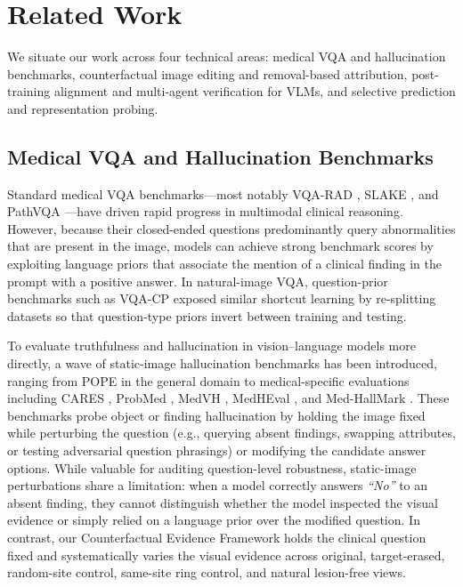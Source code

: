 \documentclass[5p,times,twocolumn,authoryear]{elsarticle}
\begin{document}
\section{Related Work}
\label{sec:related_work}
We situate our work across four technical areas: medical VQA and hallucination benchmarks, counterfactual image editing and removal-based attribution, post-training alignment and multi-agent verification for VLMs, and selective prediction and representation probing.

\subsection{Medical VQA and Hallucination Benchmarks}
\label{subsec:rw_benchmarks}
Standard medical VQA benchmarks---most notably VQA-RAD \citep{lau2018vqarad}, SLAKE \citep{liu2021slake}, and PathVQA \citep{he2020pathvqa}---have driven rapid progress in multimodal clinical reasoning. However, because their closed-ended questions predominantly query abnormalities that are present in the image, models can achieve strong benchmark scores by exploiting language priors that associate the mention of a clinical finding in the prompt with a positive answer. In natural-image VQA, question-prior benchmarks such as VQA-CP \citep{agrawal2018vqacp} exposed similar shortcut learning by re-splitting datasets so that question-type priors invert between training and testing.

To evaluate truthfulness and hallucination in vision--language models more directly, a wave of static-image hallucination benchmarks has been introduced, ranging from POPE \citep{li2023pope} in the general domain to medical-specific evaluations including CARES \citep{xia2024cares}, ProbMed \citep{yan2024probmed}, MedVH \citep{gu2024medvh}, MedHEval \citep{chang2024medheval}, and Med-HallMark \citep{chen2024medhallmark}. These benchmarks probe object or finding hallucination by holding the image fixed while perturbing the question (e.g., querying absent findings, swapping attributes, or testing adversarial question phrasings) or modifying the candidate answer options. While valuable for auditing question-level robustness, static-image perturbations share a limitation: when a model correctly answers \emph{``No''} to an absent finding, they cannot distinguish whether the model inspected the visual evidence or simply relied on a language prior over the modified question. In contrast, our Counterfactual Evidence Framework holds the clinical question fixed and systematically varies the visual evidence across original, target-erased, random-site control, same-site ring control, and natural lesion-free views.
\end{document}
